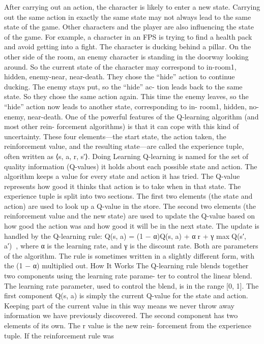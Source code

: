 \documentclass[a4paper,oneside]{report}
\begin{document}
After carrying out an action, the character is likely to enter a new state. Carrying out the same action in exactly the same state may not always lead to the same state of the game. Other characters and the player are also influencing the state of the game.
For example, a character in an FPS is trying to find a health pack and avoid getting into a fight. The character is ducking behind a pillar. On the other side of the room, an enemy character is standing in the doorway looking around. So the current state of the character may correspond to in-room1, hidden, enemy-near, near-death. They chose the “hide” action to continue ducking. The enemy stays put, so the “hide” ac- tion leads back to the same state. So they chose the same action again. This time the enemy leaves, so the “hide” action now leads to another state, corresponding to in- room1, hidden, no-enemy, near-death.
One of the powerful features of the Q-learning algorithm (and most other rein- forcement algorithms) is that it can cope with this kind of uncertainty.
These four elements—the start state, the action taken, the reinforcement value, and the resulting state—are called the experience tuple, often written as ⟨s, a, r, s′⟩.
Doing Learning
Q-learning is named for the set of quality information (Q-values) it holds about each possible state and action. The algorithm keeps a value for every state and action it has tried. The Q-value represents how good it thinks that action is to take when in that state.
The experience tuple is split into two sections. The first two elements (the state and action) are used to look up a Q-value in the store. The second two elements (the reinforcement value and the new state) are used to update the Q-value based on how good the action was and how good it will be in the next state.
The update is handled by the Q-learning rule:
Q(s, a) = (1 − α)Q(s, a) + α􏳁r + γ max􏳁Q(s′, a′)􏳂􏳂,
where α is the learning rate, and γ is the discount rate. Both are parameters of the algorithm. The rule is sometimes written in a slightly different form, with the (1 − α) multiplied out.
How It Works
The Q-learning rule blends together two components using the learning rate parame- ter to control the linear blend. The learning rate parameter, used to control the blend, is in the range [0, 1].
The first component Q(s, a) is simply the current Q-value for the state and action. Keeping part of the current value in this way means we never throw away information we have previously discovered.
The second component has two elements of its own. The r value is the new rein- forcement from the experience tuple. If the reinforcement rule was
\end{document}
